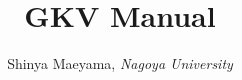 \documentclass{report}
\begin{document}
\title{GKV Manual}
\author{Shinya Maeyama, \textit{Nagoya University}}
\maketitle

\tableofcontents
















\end{document}
